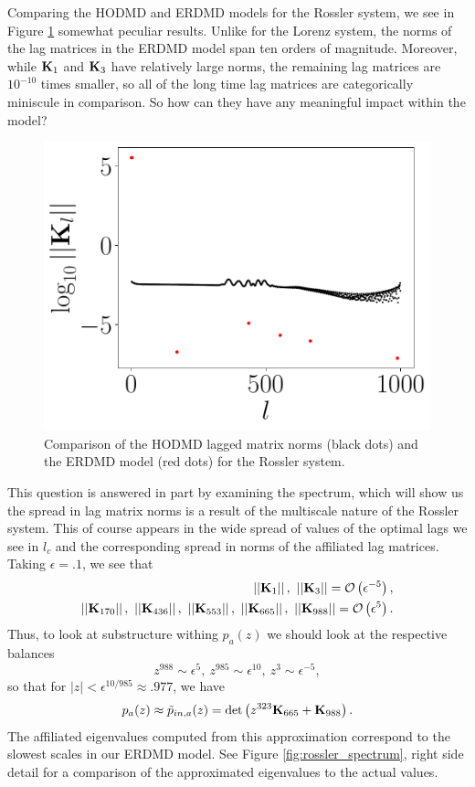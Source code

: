 \documentclass[a4paper,11pt]{article}
\newcommand{\gnorm}[1]{\left|\left|#1\right|\right|}
\begin{document}
Comparing the HODMD and ERDMD models for the Rossler system, we see in Figure \ref{fig:model_comp_d_988} somewhat peculiar results.  Unlike for the Lorenz system, the norms of the lag matrices in the ERDMD model span ten orders of magnitude.  Moreover, while ${\bf K}_{1}$ and ${\bf K}_{3}$ have relatively large norms, the remaining lag matrices are $10^{-10}$ times smaller, so all of the long time lag matrices are categorically miniscule in comparison.  So how can they have any meaningful impact within the model?  
\begin{figure}[!h]
\centering
\includegraphics[width=.7\textwidth]{Rossler_norm_full_model_988}
\caption{Comparison of the HODMD lagged matrix norms (black dots) and the ERDMD model (red dots) for the Rossler system.}
\label{fig:model_comp_d_988}
\end{figure}

This question is answered in part by examining the spectrum, which will show us the spread in lag matrix norms is a result of the multiscale nature of the Rossler system.  This of course appears in the wide spread of values of the optimal lags we see in $l_{c}$ and the corresponding spread in norms of the affiliated lag matrices.  Taking $\epsilon=.1$, we see that
\begin{align}
\gnorm{{\bf K}_{1}}, ~ \gnorm{{\bf K}_{3}}=\mathcal{O}\left(\epsilon^{-5}\right),\\ 
\gnorm{{\bf K}_{170}}, ~ \gnorm{{\bf K}_{436}}, ~ \gnorm{{\bf K}_{553}}, ~ \gnorm{{\bf K}_{665}},  ~ \gnorm{{\bf K}_{988}} =\mathcal{O}\left(\epsilon^{5}\right).
\end{align}
Thus, to look at substructure withing $p_{a}(z)$ we should look at the respective balances
\begin{equation}
z^{988}\sim \epsilon^{5}, ~ z^{985}\sim \epsilon^{10}, ~ z^{3}\sim \epsilon^{-5},
\end{equation}
so that for $|z| < \epsilon^{10/985}\approx .977$, we have 
\begin{equation}
p_{a}(z) \approx \tilde{p}_{in,a}(z) = \text{det}\left(z^{323}{\bf K}_{665} + {\bf K}_{988} \right).
\end{equation}
The affiliated eigenvalues computed from this approximation correspond to the slowest scales in our ERDMD model.  See Figure \ref{fig:rossler_spectrum}, right side detail for a comparison of the approximated eigenvalues to the actual values.  
\end{document}
